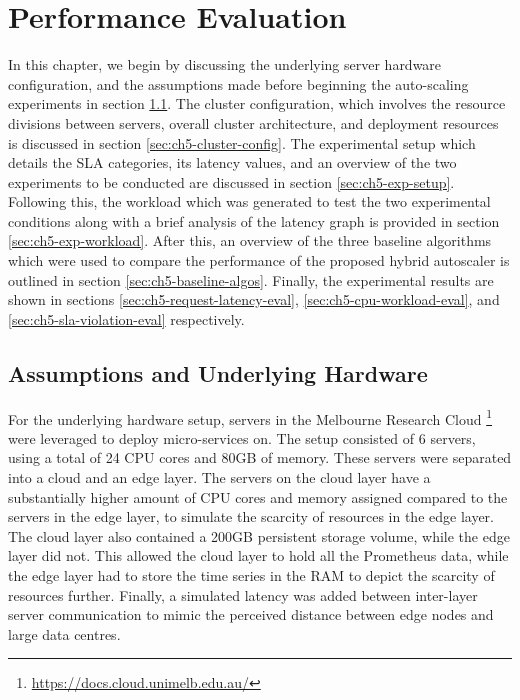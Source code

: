 \clearpage

\def\chaptertitle{Performance Evaluation}

\lhead{\emph{\chaptertitle}}

\chapter{\chaptertitle}
\label{ch:performance-evaluation}

In this chapter, we begin by discussing the underlying server hardware configuration, and the assumptions made before beginning the auto-scaling experiments in section \ref{sec:ch5-hardware-assumptions}. The cluster configuration, which involves the resource divisions between servers, overall cluster architecture, and deployment resources is discussed in section \ref{sec:ch5-cluster-config}. The experimental setup which details the SLA categories, its latency values, and an overview of the two experiments to be conducted are discussed in section \ref{sec:ch5-exp-setup}. Following this, the workload which was generated to test the two experimental conditions along with a brief analysis of the latency graph is provided in section \ref{sec:ch5-exp-workload}. After this, an overview of the three baseline algorithms which were used to compare the performance of the proposed hybrid autoscaler is outlined in section \ref{sec:ch5-baseline-algos}. Finally, the experimental results are shown in sections \ref{sec:ch5-request-latency-eval}, \ref{sec:ch5-cpu-workload-eval}, and \ref{sec:ch5-sla-violation-eval} respectively.

\section{Assumptions and Underlying Hardware}
\label{sec:ch5-hardware-assumptions}

For the underlying hardware setup, servers in the Melbourne Research Cloud \footnote{\url{https://docs.cloud.unimelb.edu.au/}} were leveraged to deploy micro-services on. The setup consisted of 6 servers, using a total of 24 CPU cores and 80GB of memory. These servers were separated into a cloud and an edge layer. The servers on the cloud layer have a substantially higher amount of CPU cores and memory assigned compared to the servers in the edge layer, to simulate the scarcity of resources in the edge layer. The cloud layer also contained a 200GB persistent storage volume, while the edge layer did not. This allowed the cloud layer to hold all the Prometheus data, while the edge layer had to store the time series in the RAM to depict the scarcity of resources further. Finally, a simulated latency was added between inter-layer server communication to mimic the perceived distance between edge nodes and large data centres.\par

